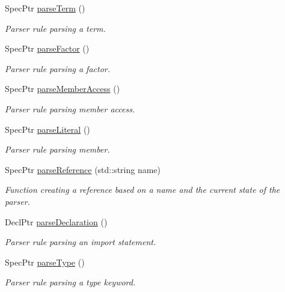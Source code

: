 \begin{DoxyCompactItemize}
Spec\-Ptr \hyperlink{classgiskard__suturo_1_1GiskardPPParser_a3e58dd2c0122a8c2b2ce0cac05316cb9}{parse\-Term} ()
\begin{DoxyCompactList}\small\item\em Parser rule parsing a term. \end{DoxyCompactList}\item 
Spec\-Ptr \hyperlink{classgiskard__suturo_1_1GiskardPPParser_a3f94b81b31397d1f84e0af44c3e2aed0}{parse\-Factor} ()
\begin{DoxyCompactList}\small\item\em Parser rule parsing a factor. \end{DoxyCompactList}\item 
Spec\-Ptr \hyperlink{classgiskard__suturo_1_1GiskardPPParser_a65a09e46160e3a4f4b88882eebb07c28}{parse\-Member\-Access} ()
\begin{DoxyCompactList}\small\item\em Parser rule parsing member access. \end{DoxyCompactList}\item 
Spec\-Ptr \hyperlink{classgiskard__suturo_1_1GiskardPPParser_ad7d2f3327f7f48a7273af852f51fbe5a}{parse\-Literal} ()
\begin{DoxyCompactList}\small\item\em Parser rule parsing member. \end{DoxyCompactList}\item 
Spec\-Ptr \hyperlink{classgiskard__suturo_1_1GiskardPPParser_afb645a65de0e1816d40e327b72d89903}{parse\-Reference} (std\-::string name)
\begin{DoxyCompactList}\small\item\em Function creating a reference based on a name and the current state of the parser. \end{DoxyCompactList}\item 
Decl\-Ptr \hyperlink{classgiskard__suturo_1_1GiskardPPParser_a94117935edd3c3935226f3a34ca485cf}{parse\-Declaration} ()
\begin{DoxyCompactList}\small\item\em Parser rule parsing an import statement. \end{DoxyCompactList}\item 
Spec\-Ptr \hyperlink{classgiskard__suturo_1_1GiskardPPParser_a05e00946126ec889106a2e19279be47f}{parse\-Type} ()
\begin{DoxyCompactList}\small\item\em Parser rule parsing a type keyword. \end{DoxyCompactList}\item 

\end{DoxyCompactItemize}
